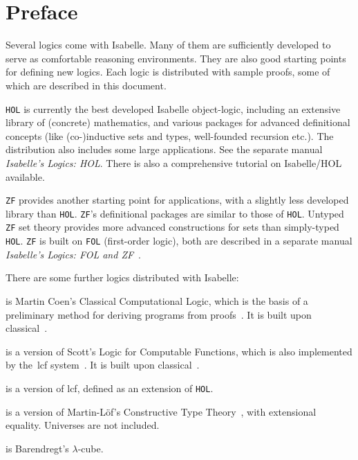 \chapter*{Preface}
Several logics come with Isabelle.  Many of them are sufficiently developed
to serve as comfortable reasoning environments.  They are also good
starting points for defining new logics.  Each logic is distributed with
sample proofs, some of which are described in this document.

\texttt{HOL} is currently the best developed Isabelle object-logic, including
an extensive library of (concrete) mathematics, and various packages for
advanced definitional concepts (like (co-)inductive sets and types,
well-founded recursion etc.). The distribution also includes some large
applications.  See the separate manual \emph{Isabelle's Logics: HOL}.  There
is also a comprehensive tutorial on Isabelle/HOL available.

\texttt{ZF} provides another starting point for applications, with a slightly
less developed library than \texttt{HOL}.  \texttt{ZF}'s definitional packages
are similar to those of \texttt{HOL}. Untyped \texttt{ZF} set theory provides
more advanced constructions for sets than simply-typed \texttt{HOL}.
\texttt{ZF} is built on \texttt{FOL} (first-order logic), both are described
in a separate manual \emph{Isabelle's Logics: FOL and ZF}~\cite{isabelle-ZF}.

\medskip There are some further logics distributed with Isabelle:
\begin{ttdescription}
\item[\thydx{CCL}] is Martin Coen's Classical Computational Logic,
  which is the basis of a preliminary method for deriving programs from
  proofs~\cite{coen92}.  It is built upon classical~\FOL{}.
 
\item[\thydx{LCF}] is a version of Scott's Logic for Computable
  Functions, which is also implemented by the~{\sc lcf}
  system~\cite{paulson87}.  It is built upon classical~\FOL{}.
  
\item[\thydx{HOLCF}] is a version of {\sc lcf}, defined as an extension of
  \texttt{HOL}\@. %
 
\item[\thydx{CTT}] is a version of Martin-L\"of's Constructive Type
Theory~\cite{nordstrom90}, with extensional equality.  Universes are not
included.

\item[\thydx{Cube}] is Barendregt's $\lambda$-cube.
 \end{ttdescription}

